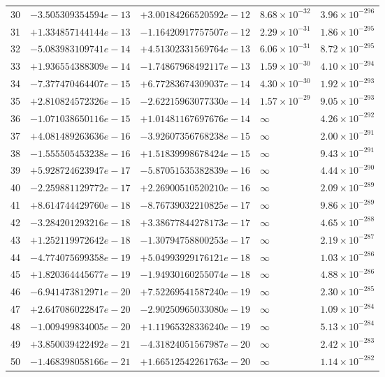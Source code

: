\documentclass[11pt]{article}
\begin{document}
\begin{longtable}{rllll}
30 & $-3.505309354594e-13$ & $+3.00184266520592e-12$ & $8.68 \times 10^{-32}$ & $3.96 \times 10^{-296}$ \\
31 & $+1.334857144144e-13$ & $-1.16420917757507e-12$ & $2.29 \times 10^{-31}$ & $1.86 \times 10^{-295}$ \\
32 & $-5.083983109741e-14$ & $+4.51302331569764e-13$ & $6.06 \times 10^{-31}$ & $8.72 \times 10^{-295}$ \\
33 & $+1.936554388309e-14$ & $-1.74867968492117e-13$ & $1.59 \times 10^{-30}$ & $4.10 \times 10^{-294}$ \\
34 & $-7.377470464407e-15$ & $+6.77283674309037e-14$ & $4.30 \times 10^{-30}$ & $1.92 \times 10^{-293}$ \\
35 & $+2.810824572326e-15$ & $-2.62215963077330e-14$ & $1.57 \times 10^{-29}$ & $9.05 \times 10^{-293}$ \\
\midrule
36 & $-1.071038650116e-15$ & $+1.01481167697676e-14$ & $\infty$ & $4.26 \times 10^{-292}$ \\
37 & $+4.081489263636e-16$ & $-3.92607356768238e-15$ & $\infty$ & $2.00 \times 10^{-291}$ \\
38 & $-1.555505453238e-16$ & $+1.51839998678424e-15$ & $\infty$ & $9.43 \times 10^{-291}$ \\
39 & $+5.928724623947e-17$ & $-5.87051535382839e-16$ & $\infty$ & $4.44 \times 10^{-290}$ \\
40 & $-2.259881129772e-17$ & $+2.26900510520210e-16$ & $\infty$ & $2.09 \times 10^{-289}$ \\
41 & $+8.614744429760e-18$ & $-8.76739032210825e-17$ & $\infty$ & $9.86 \times 10^{-289}$ \\
42 & $-3.284201293216e-18$ & $+3.38677844278173e-17$ & $\infty$ & $4.65 \times 10^{-288}$ \\
43 & $+1.252119972642e-18$ & $-1.30794758800253e-17$ & $\infty$ & $2.19 \times 10^{-287}$ \\
44 & $-4.774075699358e-19$ & $+5.04993929176121e-18$ & $\infty$ & $1.03 \times 10^{-286}$ \\
45 & $+1.820364445677e-19$ & $-1.94930160255074e-18$ & $\infty$ & $4.88 \times 10^{-286}$ \\
46 & $-6.941473812971e-20$ & $+7.52269541587240e-19$ & $\infty$ & $2.30 \times 10^{-285}$ \\
47 & $+2.647086022847e-20$ & $-2.90250965033080e-19$ & $\infty$ & $1.09 \times 10^{-284}$ \\
48 & $-1.009499834005e-20$ & $+1.11965328336240e-19$ & $\infty$ & $5.13 \times 10^{-284}$ \\
49 & $+3.850039422492e-21$ & $-4.31824051567987e-20$ & $\infty$ & $2.42 \times 10^{-283}$ \\
50 & $-1.468398058166e-21$ & $+1.66512542261763e-20$ & $\infty$ & $1.14 \times 10^{-282}$ \\
\bottomrule
\end{longtable}
\end{document}
